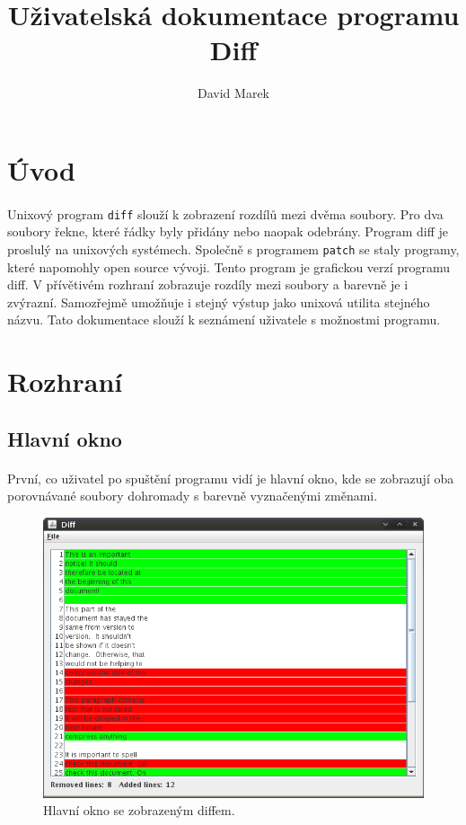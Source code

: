 \documentclass[11pt]{article}
\begin{document}
\author{David Marek}
\title{Uživatelská dokumentace programu Diff}
\date{}
\maketitle{}

\newpage{}

\section{Úvod}

\paragraph{}
Unixový program {\tt diff} slouží k zobrazení rozdílů mezi dvěma soubory. 
Pro dva soubory řekne, které řádky byly přidány nebo naopak odebrány.
Program diff je proslulý na unixových systémech. Společně s 
programem {\tt patch} se staly programy, které napomohly open source vývoji.
Tento program je grafickou verzí programu diff. V přívětivém rozhraní
zobrazuje rozdíly mezi soubory a barevně je i zvýrazní. Samozřejmě umožňuje
i stejný výstup jako unixová utilita stejného názvu.
Tato dokumentace slouží k seznámení uživatele s možnostmi programu.

\section{Rozhraní}

\subsection{Hlavní okno}

\paragraph{}
První, co uživatel po spuštění programu vidí je hlavní okno, kde se 
zobrazují oba porovnávané soubory dohromady s barevně vyznačenými změnami.
\\

\begin{figure}[H]
\centering
\includegraphics[scale=0.6]{scr1.png}
\caption{Hlavní okno se zobrazeným diffem.}
\end{figure}
\end{document}
